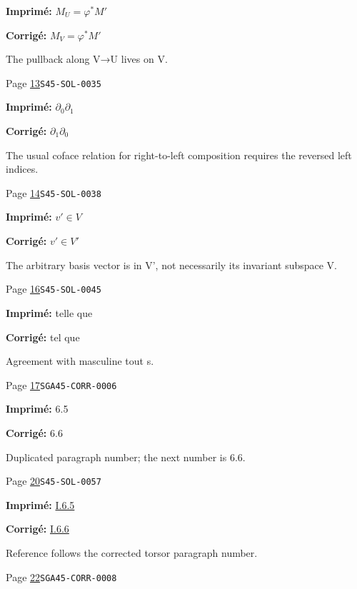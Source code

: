 \begin{description}
\par\noindent\textbf{Imprimé:} \(M_U=\varphi^* M'\)
\par\noindent\textbf{Corrigé:} \(M_V=\varphi^* M'\)
\par\noindent The pullback along V→U lives on V.
\smallskip
\item[\hypertarget{apparatus:FR-0006}{6}] Page \hyperlink{printpage:fr:13}{13}\quad\texttt{S45-SOL-0035}
\par\noindent\textbf{Imprimé:} \(\partial_0\partial_1\)
\par\noindent\textbf{Corrigé:} \(\partial_1\partial_0\)
\par\noindent The usual coface relation for right-to-left composition requires the reversed left indices.
\smallskip
\item[\hypertarget{apparatus:FR-0007}{7}] Page \hyperlink{printpage:fr:14}{14}\quad\texttt{S45-SOL-0038}
\par\noindent\textbf{Imprimé:} \(v'\in V\)
\par\noindent\textbf{Corrigé:} \(v'\in V'\)
\par\noindent The arbitrary basis vector is in V', not necessarily its invariant subspace V.
\smallskip
\item[\hypertarget{apparatus:FR-0008}{8}] Page \hyperlink{printpage:fr:16}{16}\quad\texttt{S45-SOL-0045}
\par\noindent\textbf{Imprimé:} telle que
\par\noindent\textbf{Corrigé:} tel que
\par\noindent Agreement with masculine tout s.
\smallskip
\item[\hypertarget{apparatus:FR-0009}{9}] Page \hyperlink{printpage:fr:17}{17}\quad\texttt{SGA45-CORR-0006}
\par\noindent\textbf{Imprimé:} 6.5
\par\noindent\textbf{Corrigé:} 6.6
\par\noindent Duplicated paragraph number; the next number is 6.6.
\smallskip
\item[\hypertarget{apparatus:FR-0010}{10}] Page \hyperlink{printpage:fr:20}{20}\quad\texttt{S45-SOL-0057}
\par\noindent\textbf{Imprimé:} \hyperref[I:1-6-6]{I.6.5}
\par\noindent\textbf{Corrigé:} \hyperref[I:1-6-6]{I.6.6}
\par\noindent Reference follows the corrected torsor paragraph number.
\smallskip
\item[\hypertarget{apparatus:FR-0011}{11}] Page \hyperlink{printpage:fr:22}{22}\quad\texttt{SGA45-CORR-0008}

\end{description}
